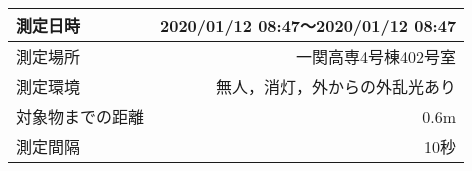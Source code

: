 \begin{tabular}{|l|r|}
    \hline
    測定日時  & 2020/01/12 08:47〜2020/01/12 08:47 \\ \hline
    測定場所  & 一関高専4号棟402号室 \\ \hline
    測定環境  & 無人，消灯，外からの外乱光あり \\ \hline
    対象物までの距離 & 0.6m \\ \hline
    測定間隔  & 10秒 \\ \hline
\end{tabular}